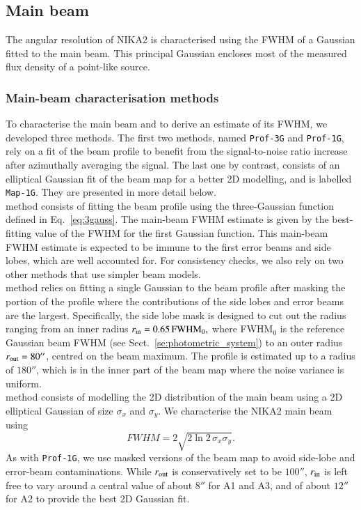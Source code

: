 \documentclass[traditionalabstract]{aa}
\newcommand{\lp}[1]{#1}
\begin{document}
{\subsection{Main beam}
\label{se:mainbeam}

The angular resolution of NIKA2 {\lp is characterised using the FWHM of a
Gaussian fitted to the main beam. This principal Gaussian encloses
most of the measured flux density of a point-like source.} 

\subsubsection{Main-beam characterisation methods}
\label{se:mainbeam_methods}
To characterise the main beam and to derive an estimate of its FWHM, we
developed three methods. The first two methods, named
{\tt Prof-3G} and {\tt Prof-1G}, rely on a fit of the beam profile to
benefit from the signal-to-noise ratio increase after azimuthally
averaging the signal. The last one by contrast,
consists of an elliptical Gaussian fit of the beam map for a better
2D modelling, and is labelled {\tt Map-1G}. They are presented in more
detail below. \\

 method consists of fitting the beam profile using the
three-Gaussian function defined in Eq.~\ref{eq:3gauss}. The main-beam
FWHM estimate is given by the best-fitting value of the FWHM for the
first Gaussian function. {\lp This main-beam FWHM estimate is expected
  to be immune to the first error beams
and side lobes, which are well accounted for. For consistency checks,
we also rely on two other methods that use simpler beam models.}\\

 method relies on fitting a single Gaussian to the beam
profile after masking the portion of the profile where the
contributions of the side lobes and error beams are the
largest. Specifically, the side lobe mask is designed to cut out {\lp the
radius ranging from an inner radius
$r_{\rm{in}} = 0.65\, \mathrm{FWHM}_0,$ where FWHM$_0$ is the
reference Gaussian beam FWHM (see Sect.~\ref{se:photometric_system})
to an outer radius $r_{\rm{out}} = 80''$,} centred on the beam
maximum.
The profile is estimated up to a radius of
$180''$, which is in the inner part of the beam map where the noise
variance is uniform.\\

 method consists of modelling the 2D distribution of
the main beam using a 2D elliptical Gaussian of size $\sigma_x$ and
$\sigma_y$. We characterise the NIKA2 main beam using
\begin{equation}
  FWHM = 2 \sqrt{2\ln {2}\, \sigma_x\sigma_y}.
  \label{eq:fwhm_geom}
\end{equation}
As with {\tt Prof-1G}, we use masked versions of the
beam map to avoid side-lobe and error-beam contaminations. 
While $r_{\rm{out}}$ is conservatively set to be $100''$,
$r_{\rm{in}}$ is left free to vary around a central value of about $8''$
for A1 and A3, and of about $12''$ for A2 to provide the best 2D Gaussian
fit.

}
\end{document}
